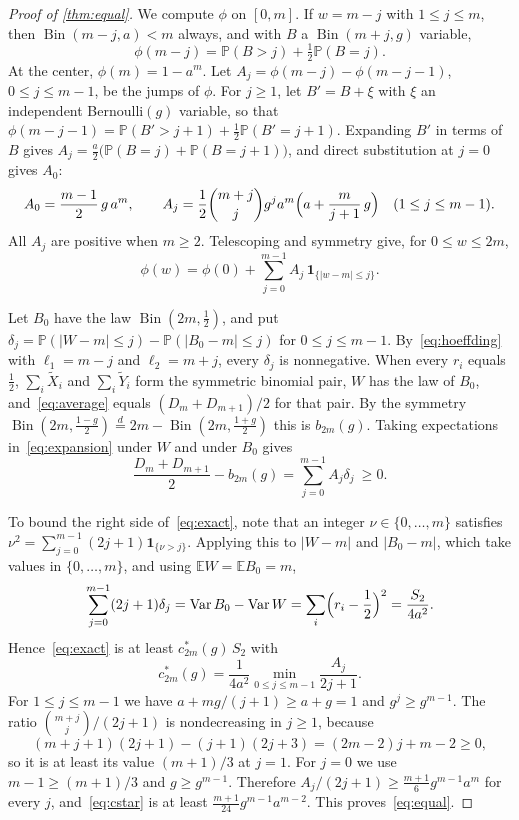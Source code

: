 \documentclass[11pt,a4paper]{article}
\numberwithin{equation}{section}
\theoremstyle{remark}
\newcommand{\Pp}{\mathbb P}
\newcommand{\E}{\mathbb E}
\newcommand{\Bin}{\operatorname{Bin}}
\begin{document}
\begin{proof}[Proof of \cref{thm:equal}]
We compute $\phi$ on $[0,m]$. If $w=m-j$ with $1\le j\le m$, then $\Bin(m-j,a)<m$ always, and with $B$ a $\Bin(m+j,g)$ variable,
\[
\phi(m-j)=\Pp(B>j)+\tfrac12\Pp(B=j).
\]
At the center, $\phi(m)=1-a^m$. Let $A_j=\phi(m-j)-\phi(m-j-1)$, $0\le j\le m-1$, be the jumps of $\phi$. For $j\ge1$, let $B'=B+\xi$ with $\xi$ an independent Bernoulli$(g)$ variable, so that $\phi(m-j-1)=\Pp(B'>j+1)+\frac12\Pp(B'=j+1)$. Expanding $B'$ in terms of $B$ gives $A_j=\frac a2\bigl(\Pp(B=j)+\Pp(B=j+1)\bigr)$, and direct substitution at $j=0$ gives $A_0$:
\begin{equation}\label{eq:jumps}
A_0=\frac{m-1}2\,g\,a^m,\qquad
A_j=\frac12\binom{m+j}{j}g^ja^m\Bigl(a+\frac{m}{j+1}\,g\Bigr)\quad(1\le j\le m-1).
\end{equation}
All $A_j$ are positive when $m\ge2$. Telescoping and symmetry give, for $0\le w\le 2m$,
\begin{equation}\label{eq:expansion}
\phi(w)=\phi(0)+\sum_{j=0}^{m-1}A_j\,\mathbf 1_{\{|w-m|\le j\}} .
\end{equation}

Let $B_0$ have the law $\Bin(2m,\frac12)$, and put $\delta_j=\Pp(|W-m|\le j)-\Pp(|B_0-m|\le j)$ for $0\le j\le m-1$. By~\eqref{eq:hoeffding} with $\ell_1=m-j$ and $\ell_2=m+j$, every $\delta_j$ is nonnegative. When every $r_i$ equals $\frac12$, $\sum_i\widetilde X_i$ and $\sum_i\widetilde Y_i$ form the symmetric binomial pair, $W$ has the law of $B_0$, and~\eqref{eq:average} equals $(D_m+D_{m+1})/2$ for that pair. By the symmetry $\Bin(2m,\frac{1-g}2)\overset d=2m-\Bin(2m,\frac{1+g}2)$ this is $b_{2m}(g)$. Taking expectations in~\eqref{eq:expansion} under $W$ and under $B_0$ gives
\begin{equation}\label{eq:exact}
\frac{D_m+D_{m+1}}2-b_{2m}(g)=\sum_{j=0}^{m-1}A_j\delta_j\ \ge0 .
\end{equation}

To bound the right side of~\eqref{eq:exact}, note that an integer $\nu\in\{0,\dots,m\}$ satisfies $\nu^2=\sum_{j=0}^{m-1}(2j+1)\mathbf 1_{\{\nu>j\}}$. Applying this to $|W-m|$ and $|B_0-m|$, which take values in $\{0,\dots,m\}$, and using $\E W=\E B_0=m$,
\begin{equation}\label{eq:variance}
\sum_{j=0}^{m-1}(2j+1)\delta_j=\operatorname{Var}B_0-\operatorname{Var}W=\sum_i\Bigl(r_i-\frac12\Bigr)^2=\frac{S_2}{4a^2}.
\end{equation}
Hence~\eqref{eq:exact} is at least $c^*_{2m}(g)\,S_2$ with
\begin{equation}\label{eq:cstar}
c^*_{2m}(g)=\frac1{4a^2}\min_{0\le j\le m-1}\frac{A_j}{2j+1}.
\end{equation}
For $1\le j\le m-1$ we have $a+mg/(j+1)\ge a+g=1$ and $g^j\ge g^{m-1}$. The ratio $\binom{m+j}{j}/(2j+1)$ is nondecreasing in $j\ge1$, because
\[
(m+j+1)(2j+1)-(j+1)(2j+3)=(2m-2)j+m-2\ge0,
\]
so it is at least its value $(m+1)/3$ at $j=1$. For $j=0$ we use $m-1\ge(m+1)/3$ and $g\ge g^{m-1}$. Therefore $A_j/(2j+1)\ge\frac{m+1}6g^{m-1}a^m$ for every $j$, and~\eqref{eq:cstar} is at least $\frac{m+1}{24}g^{m-1}a^{m-2}$. This proves~\eqref{eq:equal}.


\end{proof}
\end{document}
